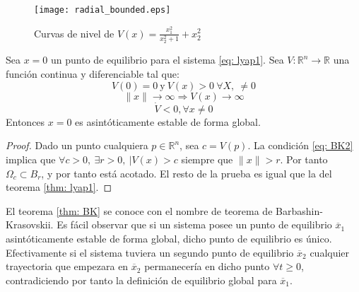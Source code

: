 \begin{figure}
 \centering
 \texttt{[image: radial\_bounded.eps]}
\caption{Curvas de nivel de $V(x) = \frac{x_1^2}{x_2^2+1}+x_2^2$}
\label{fig: radunb}
\end{figure}


\begin{theorem}\label{thm: BK}
Sea $x=0$ un punto de equilibrio para el sistema \ref{eq: lyap1}. Sea $V: \mathbb{R}^n \to \mathbb{R}$ una función continua y diferenciable tal que:
\begin{equation}
V(0) = 0 \ \text{y} \ V(x) > 0\ \forall X,\  \neq 0 
\end{equation}
\begin{equation} \label{eq: BK2}
\|x\| \to \infty \Rightarrow V(x) \to \infty
\end{equation}
\begin{equation}
\dot V < 0, \forall x \neq 0
\end{equation}
Entonces $x=0$ es asintóticamente estable de forma global. 
\end{theorem} 
\begin{proof}
Dado un punto cualquiera $p \in \mathbb{R}^n$, sea $c = V(p)$. La condición \ref{eq: BK2} implica que $\forall c>0,\ \exists r>0,\ \vert V(x) > c$ siempre que $\|x\| >r$. Por tanto $\Omega_c \subset B_r$, y por tanto está acotado. El resto de la prueba es igual que la del teorema \ref{thm: lyap1}.
\end{proof}

El teorema \ref{thm: BK} se conoce con el nombre de teorema de Barbashin-Krasovskii. Es fácil observar que si un sistema posee un punto de equilibrio $\overline x_1 $ asintóticamente estable de forma global, dicho punto de equilibrio es único. Efectivamente si el sistema tuviera un segundo punto de equilibrio $\overline x_2$ cualquier trayectoria que empezara en $\overline x_2$ permanecería en dicho punto $\forall t\geq 0$, contradiciendo por tanto la definición de equilibrio global para $\overline x_1$.

